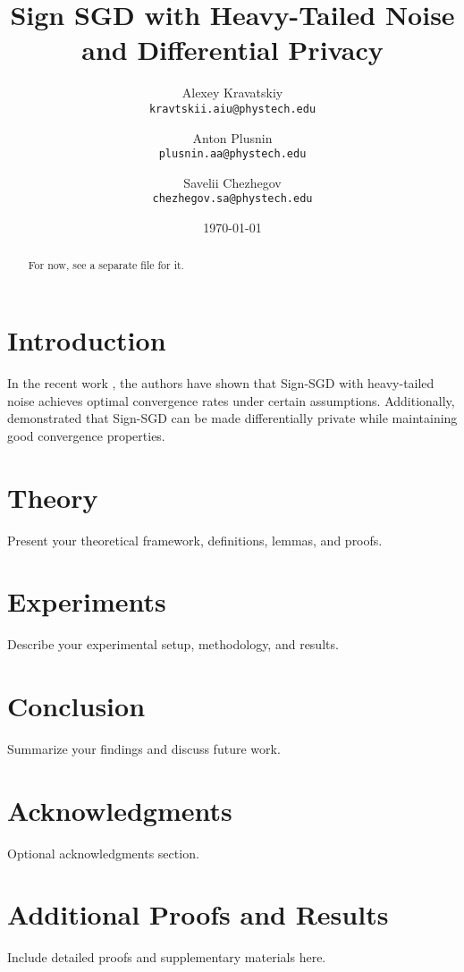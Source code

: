 \documentclass{article}
\title{Sign SGD with Heavy-Tailed Noise and Differential Privacy}
\author{
  Alexey Kravatskiy\\
  \texttt{kravtskii.aiu@phystech.edu}
  \and
  Anton Plusnin\\
  \texttt{plusnin.aa@phystech.edu}
  \and
  Savelii Chezhegov\\
  \texttt{chezhegov.sa@phystech.edu}
}
\date{\today}
\begin{document}
\maketitle

\begin{abstract}
For now, see a separate file for it.
\end{abstract}

\section{Introduction}
In the recent work \parencite{Kornilov2025}, the authors have shown that Sign-SGD with heavy-tailed noise achieves optimal convergence rates under certain assumptions. Additionally, \parencite{Jin2020} demonstrated that Sign-SGD can be made differentially private while maintaining good convergence properties.

\section{Theory}
Present your theoretical framework, definitions, lemmas, and proofs.

\section{Experiments}
Describe your experimental setup, methodology, and results.

\section{Conclusion}
Summarize your findings and discuss future work.

\section*{Acknowledgments}
Optional acknowledgments section.

\appendix
\section{Additional Proofs and Results}
Include detailed proofs and supplementary materials here.

\printbibliography
\end{document}
